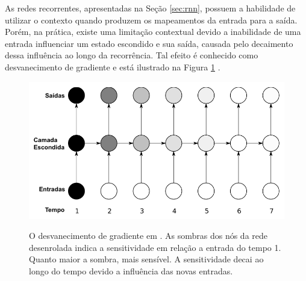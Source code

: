 As redes recorrentes, apresentadas na Seção \ref{sec:rnn}, possuem a habilidade de utilizar o contexto quando produzem os mapeamentos da entrada para a saída. Porém, na prática, existe uma limitação contextual devido a inabilidade de uma entrada influenciar um estado escondido e sua saída, causada pelo decaimento dessa influência ao longo da recorrência. Tal efeito é conhecido como desvanecimento de gradiente e está ilustrado na Figura \ref{fig:rnn-vanishing-gradient} \cite{Graves2012Supervised}.
\begin{figure}[htbp]
    \centering
        \caption[O desvanecimento de gradiente em .]{O desvanecimento de gradiente em . As sombras dos nós da rede desenrolada indica a sensitividade em relação a entrada do tempo 1. Quanto maior a sombra, mais sensível. A sensitividade decai ao longo do tempo devido a influência das novas entradas.}
        \includegraphics[scale=0.85]{resources/images/pln/rnn-vanishing-gradient.png}
        \label{fig:rnn-vanishing-gradient}
\end{figure}

